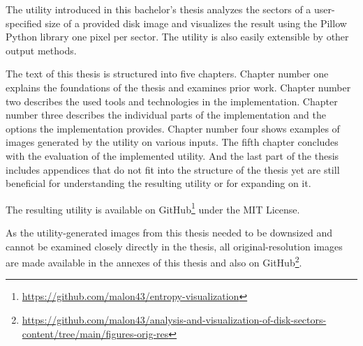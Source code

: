 \documentclass[
  digital, %
  color,   %
  oneside, %
  lof,     %
  nolot,     %
]{fithesis4}
\begin{document}
The utility introduced in this bachelor's thesis analyzes the sectors of a user-specified size of a provided disk image and visualizes the result using the Pillow Python library\cite{pillow} one pixel per sector.
The utility is also easily extensible by other output methods.

The text of this thesis is structured into five chapters.
Chapter number one explains the foundations of the thesis and examines prior work.
Chapter number two describes the used tools and technologies in the implementation.
Chapter number three describes the individual parts of the implementation and the options the implementation provides.
Chapter number four shows examples of images generated by the utility on various inputs.
The fifth chapter concludes with the evaluation of the implemented utility.
And the last part of the thesis includes appendices that do not fit into the structure of the thesis yet are still beneficial for understanding the resulting utility or for expanding on it.

The resulting utility is available on GitHub\footnote{\url{https://github.com/malon43/entropy-visualization}} under the MIT License.

As the utility-generated images from this thesis needed to be downsized and cannot be examined closely directly in the thesis, all original-resolution images are made available in the annexes of this thesis and also on GitHub\footnote{\url{https://github.com/malon43/analysis-and-visualization-of-disk-sectors-content/tree/main/figures-orig-res}}.





\end{document}
